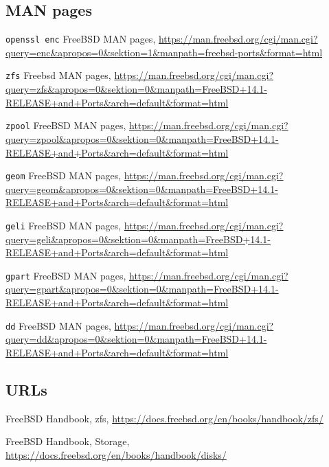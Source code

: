 \subsection{MAN pages}
\texttt{openssl enc} FreeBSD MAN pages,
\url{https://man.freebsd.org/cgi/man.cgi?query=enc\&apropos=0\&sektion=1\&manpath=freebsd-ports\&format=html}

\texttt{\gls{zfs}} Freebsd MAN pages,
\url{https://man.freebsd.org/cgi/man.cgi?query=zfs\&apropos=0\&sektion=0\&manpath=FreeBSD+14.1-RELEASE+and+Ports\&arch=default\&format=html}

\texttt{zpool} FreeBSD MAN pages,
\url{https://man.freebsd.org/cgi/man.cgi?query=zpool\&apropos=0\&sektion=0\&manpath=FreeBSD+14.1-RELEASE+and+Ports\&arch=default\&format=html}

\texttt{geom} FreeBSD MAN pages,
\url{https://man.freebsd.org/cgi/man.cgi?query=geom\&apropos=0\&sektion=0\&manpath=FreeBSD+14.1-RELEASE+and+Ports\&arch=default\&format=html}

\texttt{geli} FreeBSD MAN pages,
\url{https://man.freebsd.org/cgi/man.cgi?query=geli\&apropos=0\&sektion=0\&manpath=FreeBSD+14.1-RELEASE+and+Ports\&arch=default\&format=html}

\texttt{gpart} FreeBSD MAN pages,
\url{https://man.freebsd.org/cgi/man.cgi?query=gpart\&apropos=0\&sektion=0\&manpath=FreeBSD+14.1-RELEASE+and+Ports\&arch=default\&format=html}

\texttt{dd} FreeBSD MAN pages,
\url{https://man.freebsd.org/cgi/man.cgi?query=dd\&apropos=0\&sektion=0\&manpath=FreeBSD+14.1-RELEASE+and+Ports\&arch=default\&format=html}

\subsection{URLs}
FreeBSD Handbook, \gls{zfs}, \url{https://docs.freebsd.org/en/books/handbook/zfs/}

FreeBSD Handbook, Storage, \url{https://docs.freebsd.org/en/books/handbook/disks/}

\markchapterendnotes
